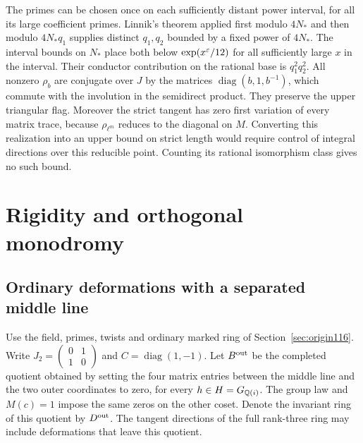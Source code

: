 \documentclass[a4paper,11pt]{article}
\theoremstyle{definition}
\theoremstyle{remark}
\numberwithin{equation}{section}
\begin{document}
The primes can be chosen once on each sufficiently distant power
interval, for all its large coefficient primes. Linnik's theorem
applied first modulo \(4N_*\) and then modulo \(4N_*q_1\) supplies
distinct \(q_1,q_2\) bounded by a fixed power of \(4N_*\).
The interval bounds on \(N_*\) place both below
\(\exp(x^\varepsilon/12)\) for all sufficiently large \(x\) in the interval.
Their conductor contribution on the rational base is \(q_1^2q_2^2\).
All nonzero \(\rho_b\) are conjugate over \(J\) by the matrices
\(\operatorname{diag}(b,1,b^{-1})\), which commute with the
involution in the semidirect product. They preserve the upper
triangular flag. Moreover the strict tangent has zero first variation
of every matrix trace, because \(\rho_{\ell^m}\) reduces to the
diagonal on \(M\). Converting this realization into an upper bound on
strict length would require control of integral directions over this
reducible point. Counting its rational isomorphism class gives no
such bound.

\section{Rigidity and orthogonal monodromy}\label{nav:g-IV-3}

\subsection{Ordinary deformations with a separated middle line}\label{nav:IV-18}
\label{sec:corner117}

Use the field, primes, twists and ordinary marked ring of
Section~\ref{sec:origin116}. Write \(J_2=\left(\begin{smallmatrix}
0&1\\1&0\end{smallmatrix}\right)\) and \(C=\operatorname{diag}(1,-1)\).
Let \(B^{\rm out}\) be the completed quotient obtained by setting
the four matrix entries between the middle line and the two
outer coordinates to zero, for every \(h\in H=G_{\mathbb Q(i)}\).
The group law and \(M(c)=1\) impose the same zeros on the other
coset. Denote the invariant ring of this quotient by \(D^{\rm out}\).
The tangent directions of the full rank-three ring may include
deformations that leave this quotient.
\end{document}
